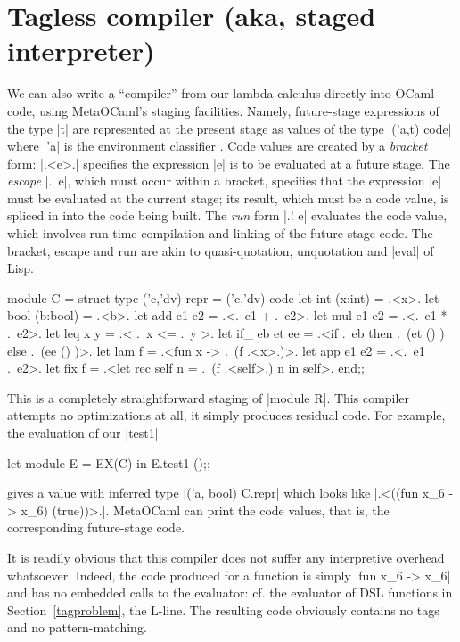\documentclass[preprint]{sigplanconf}
\let\cite=\citep
\begin{document}
\section{Tagless compiler (aka, staged interpreter)}\label{compiler}

We can also write a ``compiler'' from our lambda calculus directly
into OCaml code, using MetaOCaml's staging facilities. Namely,
future-stage expressions of the type |t| are represented at the
present stage as values of the type |('a,t) code| where |'a| is the
environment classifier \cite{WalidPOPL03,WalidESOP04}. Code values are created
by a \emph{bracket} form: |.<e>.| specifies the expression |e| is to be
evaluated at a future stage. The \emph{escape} |.~e|, which must occur
within a bracket, specifies that the expression |e| must be evaluated
at the current stage; its result, which must be a code value, is
spliced in into the code being built. The \emph{run} form |.! e|
evaluates the code value, which involves run-time compilation and
linking of the future-stage code. The bracket, escape and run are akin to
quasi-quotation, unquotation and |eval| of Lisp.


\begin{code}
module C = struct
  type ('c,'dv) repr = ('c,'dv) code
  let int (x:int)   = .<x>.
  let bool (b:bool) = .<b>.
  let add e1 e2     = .<.~e1 + .~e2>.
  let mul e1 e2     = .<.~e1 * .~e2>.
  let leq x y       = .< .~x <= .~y >.
  let if_ eb et ee = 
    .<if .~eb then .~(et () ) else .~(ee () )>.
  let lam f         = .<fun x -> .~(f .<x>.)>.
  let app e1 e2     = .<.~e1 .~e2>.
  let fix f = 
     .<let rec self n = .~(f .<self>.) n in self>.
end;;
\end{code}
This is a completely straightforward staging of
|module R|.
This compiler attempts no optimizations at all, it simply produces
residual code. For example, the evaluation of our |test1|
\begin{code}
  let module E = EX(C) in E.test1 ();;
\end{code}
gives a value with inferred type |('a, bool) C.repr| which looks
like |.<((fun x_6 -> x_6) (true))>.|. MetaOCaml can print the code
values, that is, the corresponding future-stage code.

It is readily obvious that this compiler does not suffer
any interpretive overhead whatsoever. Indeed, the
  code produced for a function is simply |fun x_6 -> x_6| and has no 
  embedded calls to the evaluator: cf. the evaluator of DSL functions
  in Section~\ref{tagproblem}, the L-line.
The resulting code obviously contains no tags and no pattern-matching.
\end{document}
